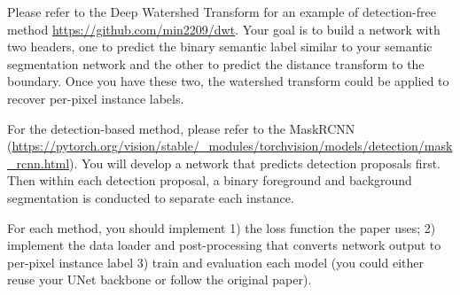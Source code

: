 \documentclass[11pt]{article}
\begin{document}
Please refer to the Deep Watershed Transform for an example of detection-free method \url{https://github.com/min2209/dwt}. Your goal is to build a network with two headers, one to predict the binary semantic label similar to your semantic segmentation network and the other to predict the distance transform to the boundary. Once you have these two, the watershed transform could be applied to recover per-pixel instance labels.  

For the detection-based method, please refer to the MaskRCNN (\url{https://pytorch.org/vision/stable/_modules/torchvision/models/detection/mask_rcnn.html}). You will develop a network that predicts detection proposals first. Then within each detection proposal, a binary foreground and background segmentation is conducted to separate each instance. 

For each method, you should implement 1) the loss function the paper uses; 2) implement the data loader and post-processing that converts network output to per-pixel instance label 3) train and evaluation each model (you could either reuse your UNet backbone or follow the original paper). 
\end{document}
